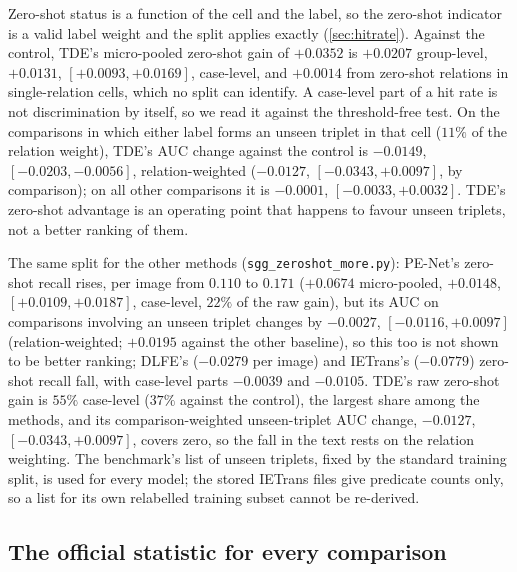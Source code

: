 Zero-shot status is a function of the cell and the label, so the zero-shot indicator is a valid
label weight and the split applies exactly (\cref{sec:hitrate}). Against the control, TDE's
micro-pooled zero-shot gain of $+0.0352$ is $+0.0207$ group-level, $+0.0131$,
$[+0.0093,+0.0169]$, case-level, and $+0.0014$ from zero-shot relations in single-relation cells,
which no split can identify. A case-level part of a hit rate is not discrimination by itself, so we
read it against the threshold-free test. On the comparisons in which either label forms an unseen
triplet in that cell ($11\%$ of the relation weight), TDE's AUC change against the control is
$-0.0149$, $[-0.0203,-0.0056]$, relation-weighted ($-0.0127$, $[-0.0343,+0.0097]$, by comparison);
on all other comparisons it is $-0.0001$, $[-0.0033,+0.0032]$. TDE's zero-shot advantage is an
operating point that happens to favour unseen triplets, not a better ranking of them.

The same split for the other methods (\texttt{sgg\_zeroshot\_more.py}): PE-Net's zero-shot
recall rises, per image from $0.110$ to $0.171$ ($+0.0674$ micro-pooled, $+0.0148$,
$[+0.0109,+0.0187]$, case-level, $22\%$ of the raw gain), but its AUC on comparisons involving an
unseen triplet changes by $-0.0027$, $[-0.0116,+0.0097]$ (relation-weighted; $+0.0195$ against
the other baseline), so this too is not shown to be better ranking; DLFE's ($-0.0279$ per image) and
IETrans's ($-0.0779$) zero-shot recall fall, with case-level parts $-0.0039$ and $-0.0105$. TDE's
raw zero-shot gain is $55\%$ case-level ($37\%$ against the control), the largest share among the
methods, and its comparison-weighted unseen-triplet AUC change, $-0.0127$, $[-0.0343,+0.0097]$,
covers zero, so the fall in the text rests on the relation weighting. The benchmark's list of
unseen triplets, fixed by the standard training split, is used for every model; the stored
IETrans files give predicate counts only, so a list for its own relabelled training subset cannot
be re-derived.

\begin{table}[h]
\centering
\scriptsize
\caption{\textbf{Stratified and zero-shot recall@50} (graph constraint). $\Delta mR$: micro-pooled
mean recall; head, body, tail: mean change over the tier's predicates; $\Delta zR$: per-image
zero-shot recall, as the official evaluator.}
\label{tab:diagnostics}

\end{table}

\subsection{The official statistic for every comparison}\label{app:officialall}

